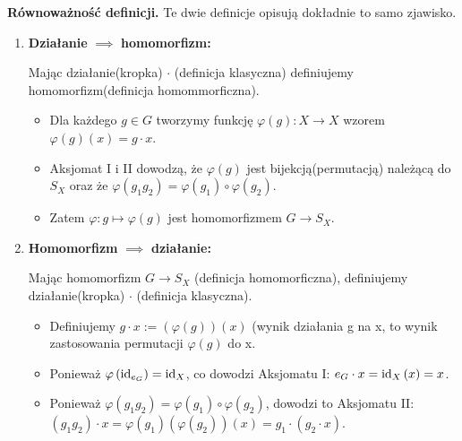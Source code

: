 \noindent\textbf{Równoważność definicji.} Te dwie definicje opisują dokładnie to samo zjawisko.
\begin{enumerate}[label=\arabic*.]
	\item \textbf{Działanie} $\implies$ \textbf{homomorfizm:}

		Mając działanie(kropka) $\cdot $ (definicja klasyczna) definiujemy homomorfizm(definicja homommorficzna).
		\begin{itemize}
			\item Dla każdego $g\in G$ tworzymy funkcję $\varphi\left( g \right): X\rightarrow X$ wzorem $\varphi\left( g \right) \left( x \right) = g\cdot x$.
			\item Aksjomat I i II dowodzą, że  $\varphi\left( g \right) $ jest bijekcją(permutacją) należącą do $S_{X}$ oraz że $\varphi\left( g_1g_2 \right) = \varphi\left( g_1 \right) \circ \varphi\left( g_2 \right) $.
			\item Zatem $\varphi : g \mapsto \varphi\left( g \right) $ jest homomorfizmem $G\rightarrow S_{X}$.
		\end{itemize}
	\item \textbf{Homomorfizm} $\implies$ \textbf{działanie:}
		
		Mając homomorfizm $G\rightarrow S_{X}$ (definicja homomorficzna), definiujemy działanie(kropka) $\cdot $ (definicja klasyczna).
		\begin{itemize}
			\item Definiujemy $g\cdot x := \left( \varphi\left( g \right)  \right)\left( x \right)$ (wynik działania g na x, to wynik zastosowania permutacji $\varphi\left( g \right) $ do x.
			\item Ponieważ $\varphi\left( \operatorname{id}_{e_{G}} \right) = \operatorname{id}_{X}$, co dowodzi Aksjomatu I: $e_{G}\cdot x = \operatorname{id}_{X}\left( x \right) = x$.
			\item Ponieważ $\varphi\left( g_1g_2 \right) = \varphi\left( g_1 \right) \circ \varphi\left( g_2 \right) $, dowodzi to Aksjomatu II: $\left( g_1g_2 \right) \cdot x = \varphi\left( g_1 \right) \left( \varphi\left( g_2 \right)  \right) \left( x \right) = g_1\cdot \left( g_2\cdot x \right) $.
		\end{itemize}
\end{enumerate}
